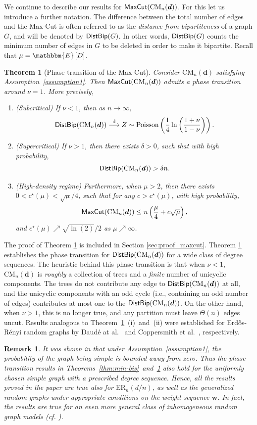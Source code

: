 \documentclass[11pt,a4paper, reqno]{article}
\numberwithin{equation}{section}
\numberwithin{equation}{section}
\newcommand{\expt}[1]{\ensuremath{\mathbbm{E}\left[#1\right]}}
\newcommand{\1}{\ensuremath{\mathbbm{1}}}
\newcommand{\CM}{\ensuremath{\mathrm{CM}_n(\boldsymbol{d})}}
\newcommand{\ER}{\ensuremath{\mathrm{ER}_n(d/n)}}
\newcommand{\Mcut}{{\sf{MaxCut}}}
\newcommand{\DB}{{\sf DistBip}}
\newtheorem{theorem}{Theorem}
\newtheorem{remark}{Remark}
\numberwithin{equation}{section}
\numberwithin{theorem}{section}
\begin{document}
We continue to describe our results for $\Mcut(\CM)$.
For this let us introduce a further notation. 
The difference between the total number of edges and the Max-Cut is often referred to as the \emph{distance from bipartiteness} of a graph $G$, and will be denoted by $\DB(G)$.
In other words, $\DB(G)$ counts the minimum number of edges in $G$ to be deleted in order to make it bipartite. 
Recall that $\mu = \expt{D}$.
\begin{theorem}[Phase transition of the Max-Cut]
\label{thm:max-cut}
 Consider $\CM$ satisfying {\rm Assumption~\ref{assumption1}}. Then $\Mcut(\CM)$ admits a phase transition around $\nu=1$. More precisely, 
  \begin{enumerate}[{\normalfont (i)}] 
  \item {\normalfont (Subcritical)} If $\nu<1$, then as $n\to\infty$,
  $$\DB(\CM)\overset{\mathrm{d}}{\longrightarrow} Z\sim\mathrm{Poisson}\left(\frac{1}{4}\ln\left(\frac{1+\nu}{1-\nu}\right)\right).$$
  \item {\normalfont(Supercritical)} If $\nu>1$, then there exists $\delta>0$, such that with high probability, 
  $$\DB(\CM)>\delta n.$$
  \item {\normalfont(High-density regime)} Furthermore, when $\mu>2$, then there exists $0<c^\star(\mu)<\sqrt{\mu} /4$, such that for any $c>c^{\star}(\mu)$, with high probability, 
  $$\Mcut(\CM) \leq n\left(\frac{\mu}{4} +  c \sqrt{\mu}\right),$$ 
 and $c^\star(\mu)\nearrow \sqrt{\ln (2)}/2$  as $\mu\nearrow\infty$.
   \end{enumerate}
\end{theorem}
The proof of Theorem \ref{thm:max-cut} is included in Section \ref{sec:proof_maxcut}. 
Theorem \ref{thm:max-cut} establishes the phase transition for $\DB(\CM)$ for a wide class of degree sequences. 
The heuristic behind this phase transition is that when $\nu<1$, $\CM$ is \emph{roughly} a collection of trees and a \emph{finite} number of unicyclic components.
The trees do not contribute any edge to $\DB(\CM)$ at all, and the unicyclic components with an odd cycle (i.e., containing an odd number of edges) contributes at most one to the $\DB(\CM)$. 
On the other hand, when $\nu>1$, this is no longer true, and any partition must leave $\Theta(n)$ edges uncut.
Results analogous to Theorem~\ref{thm:max-cut}~(i)~and~(ii) were established for Erd\H{o}s-R\'enyi random graphs by Daud\'e at al.~\cite{DMRR12} and Coppersmith et al.~\cite{CGHS04}, respectively.  
\begin{remark}\label{rem:simple}
\normalfont
It was shown in \cite{J09c} that under Assumption~\ref{assumption1}, the probability of the graph being simple is bounded away from zero. 
Thus the phase transition results in Theorems~\ref{thm:min-bis}~and~\ref{thm:max-cut} also hold for the uniformly chosen simple graph with a prescribed degree sequence. 
Hence, all the results proved in the paper are true also for $\ER$, as well as the generalized random graphs under appropriate conditions \cite[Theorem 6.15]{RGCN1} on the weight sequence $\boldsymbol{w}$. 
In fact, the results are true for an even more general class of inhomogeneous random graph models (cf. \cite[Theorem 6.18]{RGCN1}).
\end{remark}
\end{document}
